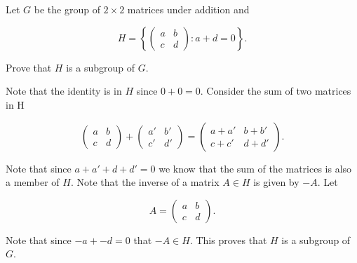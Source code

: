 \documentclass[a4paper]{article}
\begin{document}
\section{}


\section{}


\section{}

Let $G$ be the group of $2 \times 2$ matrices under addition and 

$$ H = \left\{
  \begin{pmatrix}
    a & b \\
    c & d
  \end{pmatrix} : a + d = 0\right\}.
$$

Prove that $H$ is a subgroup of $G$.

\vspace{\baselineskip}

Note that the identity is in $H$ since $0 + 0 = 0$. Consider the sum of two matrices in H

$$\begin{pmatrix}
    a & b \\
    c & d
  \end{pmatrix}
  +
  \begin{pmatrix}
    a' & b' \\
    c' & d'
  \end{pmatrix}
  =
  \begin{pmatrix}
    a + a' & b + b' \\
    c + c' & d + d'
  \end{pmatrix}.
$$

Note that since $a + a' + d + d' = 0$ we know that the sum of the matrices is also a member of $H$. Note that the inverse of a matrix $A \in H$ is given by $-A$. Let 

$$A = 
  \begin{pmatrix}
    a & b \\
    c & d
  \end{pmatrix}.
$$

Note that since $-a + -d = 0$ that $-A \in H$. This proves that $H$ is a subgroup of $G$.


\section{}
\end{document}
